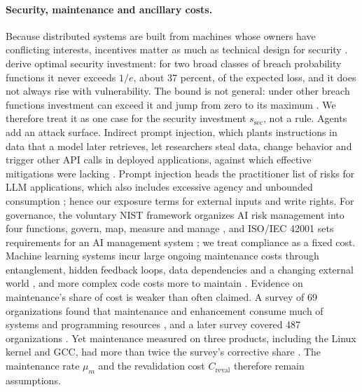 \paragraph{Security, maintenance and ancillary costs.} Because distributed systems are built from machines whose owners have conflicting interests, incentives matter as much as technical design for security \citep{anderson2006economics}. \citet{gordon2002economics} derive optimal security investment: for two broad classes of breach probability functions it never exceeds $1/e$, about 37 percent, of the expected loss, and it does not always rise with vulnerability. The bound is not general: under other breach functions investment can exceed it and jump from zero to its maximum \citep{hausken2006returns}. We therefore treat it as one case for the security investment $s_{\mathrm{sec}}$, not a rule. Agents add an attack surface. Indirect prompt injection, which plants instructions in data that a model later retrieves, let researchers steal data, change behavior and trigger other API calls in deployed applications, against which effective mitigations were lacking \citep{greshake2023not}. Prompt injection heads the practitioner list of risks for LLM applications, which also includes excessive agency and unbounded consumption \citep{owasp2024top}; hence our exposure terms for external inputs and write rights. For governance, the voluntary NIST framework organizes AI risk management into four functions, govern, map, measure and manage \citep{nist2023artificial}, and ISO/IEC 42001 sets requirements for an AI management system \citep{iso2023information}; we treat compliance as a fixed cost. Machine learning systems incur large ongoing maintenance costs through entanglement, hidden feedback loops, data dependencies and a changing external world \citep{sculley2015hidden}, and more complex code costs more to maintain \citep{banker1993software}. Evidence on maintenance's share of cost is weaker than often claimed. A survey of 69 organizations found that maintenance and enhancement consume much of systems and programming resources \citep{lientz1978characteristics}, and a later survey covered 487 organizations \citep{lientz1980software}. Yet maintenance measured on three products, including the Linux kernel and GCC, had more than twice the survey's corrective share \citep{schach2003determining}. The maintenance rate $\mu_m$ and the revalidation cost $C_{\mathrm{reval}}$ therefore remain assumptions.

